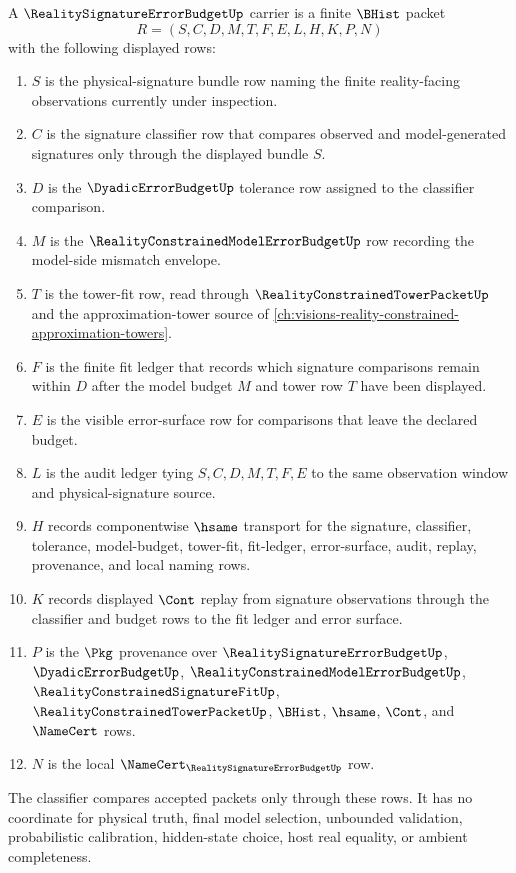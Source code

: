 \begin{definition}
\label{def:reality-signature-error-budget-carrier}
A $\RealitySignatureErrorBudgetUp$ carrier is a finite $\BHist$ packet
$$
R=(S,C,D,M,T,F,E,L,H,K,P,N)
$$
with the following displayed rows:
\begin{enumerate}
\item $S$ is the physical-signature bundle row naming the finite reality-facing observations currently under inspection.
\item $C$ is the signature classifier row that compares observed and model-generated signatures only through the displayed bundle $S$.
\item $D$ is the $\DyadicErrorBudgetUp$ tolerance row assigned to the classifier comparison.
\item $M$ is the $\RealityConstrainedModelErrorBudgetUp$ row recording the model-side mismatch envelope.
\item $T$ is the tower-fit row, read through $\RealityConstrainedTowerPacketUp$ and the approximation-tower source of \autoref{ch:visions-reality-constrained-approximation-towers}.
\item $F$ is the finite fit ledger that records which signature comparisons remain within $D$ after the model budget $M$ and tower row $T$ have been displayed.
\item $E$ is the visible error-surface row for comparisons that leave the declared budget.
\item $L$ is the audit ledger tying $S,C,D,M,T,F,E$ to the same observation window and physical-signature source.
\item $H$ records componentwise $\hsame$ transport for the signature, classifier, tolerance, model-budget, tower-fit, fit-ledger, error-surface, audit, replay, provenance, and local naming rows.
\item $K$ records displayed $\Cont$ replay from signature observations through the classifier and budget rows to the fit ledger and error surface.
\item $P$ is the $\Pkg$ provenance over $\RealitySignatureErrorBudgetUp$, $\DyadicErrorBudgetUp$, $\RealityConstrainedModelErrorBudgetUp$, $\RealityConstrainedSignatureFitUp$, $\RealityConstrainedTowerPacketUp$, $\BHist$, $\hsame$, $\Cont$, and $\NameCert$ rows.
\item $N$ is the local $\NameCert_{\RealitySignatureErrorBudgetUp}$ row.
\end{enumerate}
The classifier compares accepted packets only through these rows. It has no coordinate for physical truth, final model selection, unbounded validation, probabilistic calibration, hidden-state choice, host real equality, or ambient completeness.
\end{definition}

